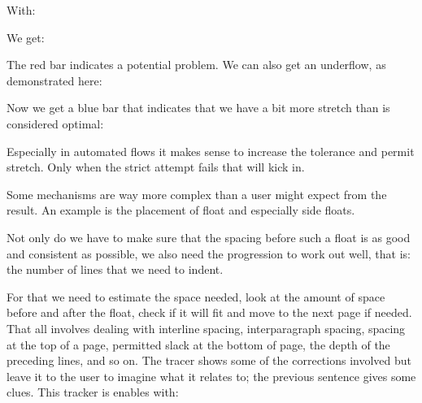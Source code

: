 \startbuffer
{}
\stopbuffer

\typebuffer

With:

\startbuffer
{}
\stopbuffer

\typebuffer

We get:

\startlinecorrection
{}
\switchtobodyfont[dejavu,12pt]
\getbuffer
{}
\stoplinecorrection

The red bar indicates a potential problem. We can also get an underflow, as demonstrated here:

\startbuffer
{}
\stopbuffer

\typebuffer

Now we get a blue bar that indicates that we have a bit more stretch than is
considered optimal:

\startlinecorrection
{}
\switchtobodyfont[dejavu,12pt]
\getbuffer
{}
\stoplinecorrection

Especially in automated flows it makes sense to increase the tolerance and permit
stretch. Only when the strict attempt fails that will kick in.

\stopsectionlevel

\startsectionlevel[title=Side floats]

Some mechanisms are way more complex than a user might expect from the result. An example is
the placement of float and especially side floats.

\startplacefigure[location=left]
    \setupexternalfigures[location={global,default}]
\stopplacefigure
{}

Not only do we have to make sure that the spacing before such a float is as good
and consistent as possible, we also need the progression to work out well, that
is: the number of lines that we need to indent. \par For that we need to estimate
the space needed, look at the amount of space before and after the float, check
if it will fit and move to the next page if needed. That all involves dealing
with interline spacing, interparagraph spacing, spacing at the top of a page,
permitted slack at the bottom of page, the depth of the preceding lines, and so
on. The tracer shows some of the corrections involved but leave it to the user to
imagine what it relates to; the previous sentence gives some clues. This tracker is
enables with:


